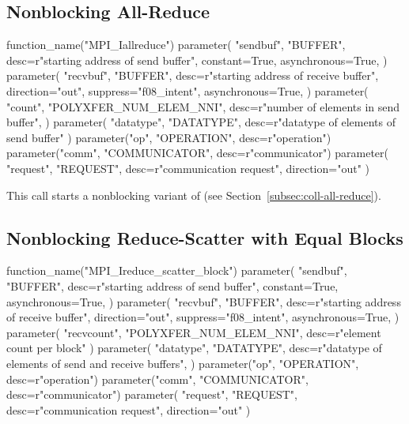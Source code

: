 \subsection{Nonblocking All-Reduce}
\label{subsec:nbcoll-all-reduce}

%
\begin{mpi-binding}
    function_name("MPI_Iallreduce")
    parameter(
        "sendbuf",
        "BUFFER",
        desc=r"starting address of send buffer",
        constant=True,
        asynchronous=True,
    )
    parameter(
        "recvbuf",
        "BUFFER",
        desc=r"starting address of receive buffer",
        direction="out",
        suppress="f08_intent",
        asynchronous=True,
    )
    parameter(
        "count",
        "POLYXFER_NUM_ELEM_NNI",
        desc=r"number of elements in send buffer",
    )
    parameter(
        "datatype", "DATATYPE", desc=r"datatype of elements of send buffer"
    )
    parameter("op", "OPERATION", desc=r"operation")
    parameter("comm", "COMMUNICATOR", desc=r"communicator")
    parameter(
        "request", "REQUEST", desc=r"communication request", direction="out"
    )
\end{mpi-binding}

This call starts a nonblocking variant of  (see
Section~\ref{subsec:coll-all-reduce}).





\subsection{Nonblocking Reduce-Scatter with Equal Blocks}
\label{sec:nbcoll-reduce-scatter-block}

%
\begin{mpi-binding}
    function_name("MPI_Ireduce_scatter_block")
    parameter(
        "sendbuf",
        "BUFFER",
        desc=r"starting address of send buffer",
        constant=True,
        asynchronous=True,
    )
    parameter(
        "recvbuf",
        "BUFFER",
        desc=r"starting address of receive buffer",
        direction="out",
        suppress="f08_intent",
        asynchronous=True,
    )
    parameter(
        "recvcount", "POLYXFER_NUM_ELEM_NNI", desc=r"element count per block"
    )
    parameter(
        "datatype",
        "DATATYPE",
        desc=r"datatype of elements of send and receive buffers",
    )
    parameter("op", "OPERATION", desc=r"operation")
    parameter("comm", "COMMUNICATOR", desc=r"communicator")
    parameter(
        "request", "REQUEST", desc=r"communication request", direction="out"
    )
\end{mpi-binding}

